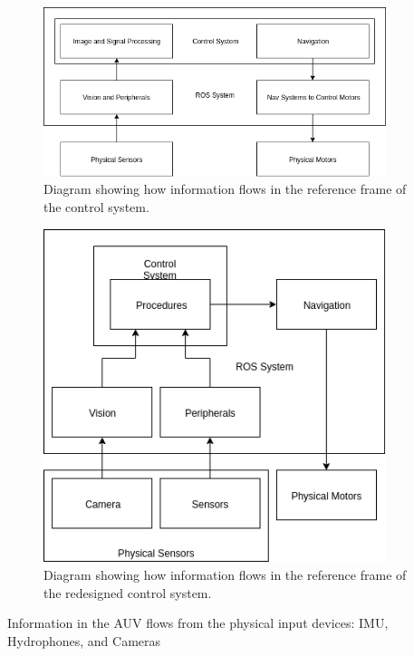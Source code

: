 \begin{figure}
\centering
\includegraphics[width=100mm]{Figures/InformationFlow}
\decoRule
\caption[Original Information Flow]{Diagram showing how information flows in the reference frame of the control system.}
\label{fig:InformationFlow}
\end{figure}

\begin{figure}
\centering
\includegraphics[width=100mm]{Figures/InformationFlowNew}
\decoRule
\caption[New Information Flow]{Diagram showing how information flows in the reference frame of the redesigned control system.}
\label{fig:InformationFlowNew}
\end{figure}


Information in the AUV flows from the physical input devices: IMU, Hydrophones, and Cameras




